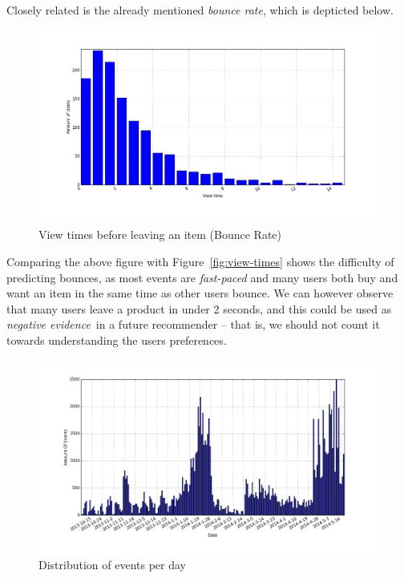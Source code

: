 Closely related is the already mentioned \textit{bounce rate}, which is
depticted below.

\begin{figure}[H]
  \centering
  \includegraphics[width=5in]{image/product_detail_clickeddistribution.png}
  \caption{View times before leaving an item (Bounce Rate)}
  \label{figure:bounceRate}
\end{figure}

Comparing the above figure with Figure~\ref{fig:view-times} shows the
difficulty of predicting bounces, as most events are \textit{fast-paced} and
many users both buy and want an item in the same time as other users bounce.
We can however observe that many users leave a product in under 2 seconds, and
this could be used as \textit{negative evidence} in a future recommender --
that is, we should not count it towards understanding the users preferences.

\begin{figure}[H]
  \centering
  \includegraphics[width=5in]{image/eventsPerDay.png}
  \caption{Distribution of events per day}
  \label{figure:eventOnDaysDist}
\end{figure}

